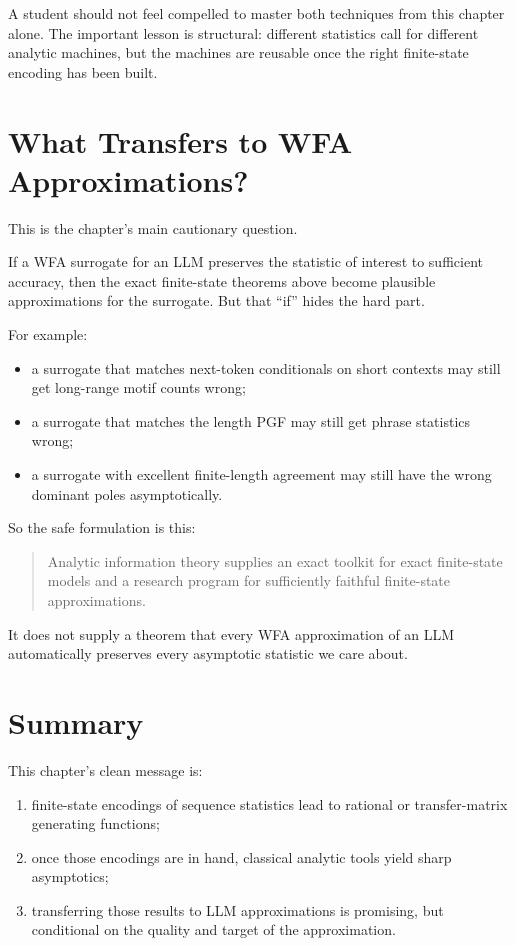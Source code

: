 A student should not feel compelled to master both techniques from this chapter alone. The important lesson is structural: different statistics call for different analytic machines, but the machines are reusable once the right finite-state encoding has been built.

\section{What Transfers to WFA Approximations?}

This is the chapter's main cautionary question.

If a WFA surrogate for an LLM preserves the statistic of interest to sufficient accuracy, then the exact finite-state theorems above become plausible approximations for the surrogate. But that ``if'' hides the hard part.

For example:
\begin{itemize}
  \item a surrogate that matches next-token conditionals on short contexts may still get long-range motif counts wrong;
  \item a surrogate that matches the length PGF may still get phrase statistics wrong;
  \item a surrogate with excellent finite-length agreement may still have the wrong dominant poles asymptotically.
\end{itemize}

So the safe formulation is this:
\begin{quote}
Analytic information theory supplies an exact toolkit for exact finite-state models and a research program for sufficiently faithful finite-state approximations.
\end{quote}
It does not supply a theorem that every WFA approximation of an LLM automatically preserves every asymptotic statistic we care about.

\section*{Summary}

This chapter's clean message is:
\begin{enumerate}
  \item finite-state encodings of sequence statistics lead to rational or transfer-matrix generating functions;
  \item once those encodings are in hand, classical analytic tools yield sharp asymptotics;
  \item transferring those results to LLM approximations is promising, but conditional on the quality and target of the approximation.
\end{enumerate}

